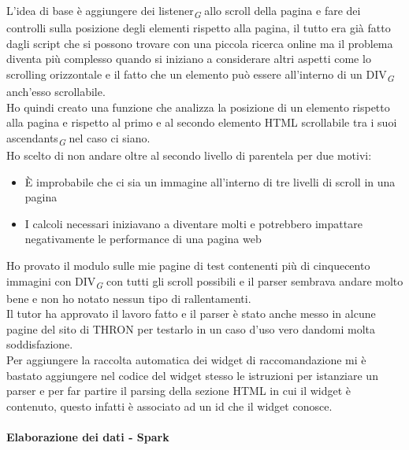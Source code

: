 \documentclass[a4paper, 12pt, twoside, openright]{book}
\newcommand{\gloss}[1]{#1\textsubscript{\textit{\tiny{G}}}}
\begin{document}
L'idea di base è aggiungere dei \gloss{listener} allo scroll della pagina e fare dei controlli sulla posizione degli elementi rispetto alla pagina, il tutto era già fatto dagli script che si possono trovare con una piccola ricerca online ma il problema diventa più complesso quando si iniziano a considerare altri aspetti come lo scrolling orizzontale e il fatto che un elemento può essere all'interno di un \gloss{DIV} anch'esso scrollabile.\\
Ho quindi creato una funzione che analizza la posizione di un elemento rispetto alla pagina e rispetto al primo e al secondo elemento HTML scrollabile tra i suoi \gloss{ascendants} nel caso ci siano.\\
Ho scelto di non andare oltre al secondo livello di parentela per due motivi:
\begin{itemize}
	\item \`{E} improbabile che ci sia un immagine all'interno di tre livelli di scroll in una pagina
	\item I calcoli necessari iniziavano a diventare molti e potrebbero impattare negativamente le performance di una pagina web
\end{itemize} 
Ho provato il modulo sulle mie pagine di test contenenti più di cinquecento immagini con \gloss{DIV} con tutti gli scroll possibili e il parser sembrava andare molto bene e non ho notato nessun tipo di rallentamenti.\\
Il tutor ha approvato il lavoro fatto e il parser è stato anche messo in alcune pagine del sito di THRON per testarlo in un caso d'uso vero dandomi molta soddisfazione.\\
Per aggiungere la raccolta automatica dei widget di raccomandazione mi è bastato aggiungere nel codice del widget stesso le istruzioni per istanziare un parser e per far partire il parsing della sezione HTML in cui il widget è contenuto, questo infatti è associato ad un id che il widget conosce.

\paragraph{Elaborazione dei dati - Spark}




\end{document}
